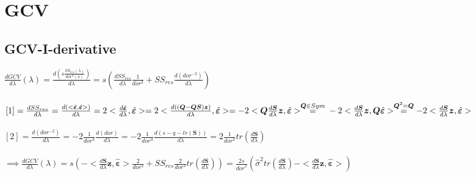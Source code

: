 \documentclass[11pt,twoside]{report}
\begin{document}
\chapter{GCV}
\section{GCV-I-derivative}
$ \frac{dGCV}{d\lambda}(\lambda) = \frac{d(s\frac{SS_{res}(\lambda)}{dor^2(\lambda)})}{d\lambda} = s (\frac{dSS_{res}}{d\lambda}\frac{1}{dor^2} + SS_{res}\frac{d(dor^{-2})}{d\lambda}) $\\
\\
$[1] = \frac{dSS_{res}}{d\lambda} = \frac{d(<\hat{\mathbold{\varepsilon}},\hat{\mathbold{\varepsilon}}> )}{d\lambda} = 2<\frac{d\hat{\mathbold{\varepsilon}}}{d\lambda},\hat{\mathbold{\varepsilon}}> = 2 < \frac{d((\mathbold{Q}-\mathbold{Q}\mathbold{S})\mathbold{z})}{d\lambda}, \hat{\mathbold{\varepsilon}}> = -2<\mathbold{Q}\frac{d\mathbold{S}}{d\lambda}\mathbold{z}, \hat{\mathbold{\varepsilon}}> \overset{\mathbold{Q}\in Sym}{=}\\ -2<\frac{d\mathbold{S}}{d\lambda}\mathbold{z},\mathbold{Q} \hat{\mathbold{\varepsilon}}> \overset{\mathbold{Q}^2 = \mathbold{Q}}{=} -2<\frac{d\mathbold{S}}{d\lambda}\mathbold{z}, \hat{\mathbold{\varepsilon}}>$\\
\\
$[2]= \frac{d(dor^{-2})}{d\lambda} = -2\frac{1}{dor^3}\frac{d(dor)}{d\lambda} = -2\frac{1}{dor^3}\frac{d(s-q-tr(\mathbold{S}))}{d\lambda} = 2\frac{1}{dor^3}tr(\frac{d\mathbold{S}}{d\lambda})$\\
\\
$\implies \frac{dGCV}{d\lambda}(\lambda) = s (-<\frac{d\mathbold{S}}{d\lambda}\mathbold{z}, \hat{\mathbold{\varepsilon}}>\frac{2}{dor^2} + SS_{res}\frac{2}{dor^3}tr(\frac{d\mathbold{S}}{d\lambda})) = \frac{2s}{{dor}^2}(\hat{\sigma}^2tr(\frac{d\mathbold{S}}{d\lambda}) - <\frac{d\mathbold{S}}{d\lambda}\mathbold{z}, \hat{\mathbold{\varepsilon}}>)$
\end{document}
